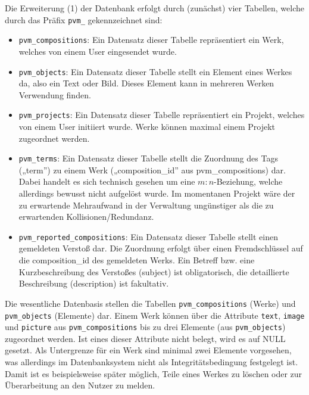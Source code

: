 \documentclass[a4paper,11pt]{article}
\begin{document}
Die Erweiterung (1) der Datenbank erfolgt durch (zunächst) vier Tabellen,
welche durch das Präfix \texttt{pvm\_} gekennzeichnet sind:
\begin{itemize}
\item \texttt{pvm\_compositions}: Ein Datensatz dieser Tabelle repräsentiert
  ein Werk, welches von einem User eingesendet wurde.
\item \texttt{pvm\_objects}: Ein Datensatz dieser Tabelle stellt ein Element
  eines Werkes da, also ein Text oder Bild. Dieses Element kann in mehreren
  Werken Verwendung finden.
\item \texttt{pvm\_projects}: Ein Datensatz dieser Tabelle repräsentiert ein
  Projekt, welches von einem User initiiert wurde. Werke können maximal einem
  Projekt zugeordnet werden.
\item \texttt{pvm\_terms}: Ein Datensatz dieser Tabelle stellt die Zuordnung
  des Tags („term”) zu einem Werk („composition\_id” aus pvm\_compositions)
  dar. Dabei handelt es sich technisch gesehen um eine $m:n$-Beziehung, welche
  allerdings bewusst nicht aufgelöst wurde. Im momentanen Projekt wäre der zu
  erwartende Mehraufwand in der Verwaltung ungünstiger als die zu erwartenden
  Kollisionen/Redundanz.
\item \texttt{pvm\_reported\_compositions}: Ein Datensatz dieser Tabelle
  stellt einen gemeldeten Verstoß dar.  Die Zuordnung erfolgt über einen
  Fremdschlüssel auf die composition\_id des gemeldeten Werks. Ein Betreff
  bzw. eine Kurzbeschreibung des Verstoßes (subject) ist obligatorisch, die
  detaillierte Beschreibung (description) ist fakultativ.
\end{itemize}
Die wesentliche Datenbasis stellen die Tabellen \texttt{pvm\_compositions}
(Werke) und \texttt{pvm\_objects} (Elemente) dar. Einem Werk können über die
Attribute \texttt{text}, \texttt{image} und \texttt{picture} aus
\texttt{pvm\_compositions} bis zu drei Elemente (aus \texttt{pvm\_objects})
zugeordnet werden. Ist eines dieser Attribute nicht belegt, wird es auf NULL
gesetzt. Als Untergrenze für ein Werk sind minimal zwei Elemente vorgesehen,
was allerdings im Datenbanksystem nicht als Integritätsbedingung festgelegt
ist. Damit ist es beispielsweise später möglich, Teile eines Werkes zu löschen
oder zur Überarbeitung an den Nutzer zu melden.
 
\end{document}
